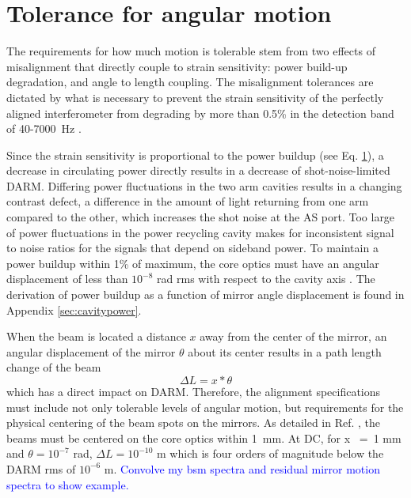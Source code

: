 \section{Tolerance for angular motion}

The requirements for how much motion is tolerable stem from two effects of misalignment that directly couple to strain sensitivity: power build-up degradation, and angle to length coupling. The misalignment tolerances are dictated by what is necessary to prevent the strain sensitivity of the perfectly aligned interferometer from degrading by more than 0.5\% in the detection band of 40-7000~Hz \cite{Fritschel1997Alignment}.

Since the strain sensitivity is proportional to the power buildup (see Eq. \ref{}), a decrease in circulating power directly results in a decrease of shot-noise-limited DARM. Differing power fluctuations in the two arm cavities results in a changing contrast defect, a difference in the amount of light returning from one arm compared to the other, which increases the shot noise at the AS port. Too large of power fluctuations in the power recycling cavity makes for inconsistent signal to noise ratios for the signals that depend on sideband power. To maintain a power buildup within 1\% of maximum, the core optics must have an angular displacement of less than $10^{-8}$ rad rms with respect to the cavity axis \cite{ISCGroup1998ASC}. The derivation of power buildup as a function of mirror angle displacement is found in Appendix \ref{sec:cavitypower}.

When the beam is located a distance $x$ away from the center of the mirror, an
angular displacement of the mirror $\theta$ about its center results in a path
length change of the beam
\begin{equation}
\Delta{L} = x * \theta
\end{equation}
which has a direct impact on DARM. Therefore, the alignment specifications must include not only tolerable levels of angular motion, but requirements for the physical centering of the beam spots on the mirrors. As detailed in Ref. \cite{ISCGroup1998ASC}, the beams must be centered on the core optics within 1~mm. At DC, for x ~=~1 mm and $\theta = 10^{-7}$ rad, $\Delta{L} = 10^{-10}$ m which is four orders of magnitude below the DARM rms of $10^{-6}$ m. \textcolor{blue}{Convolve my bsm spectra and residual mirror motion spectra to show example.}



